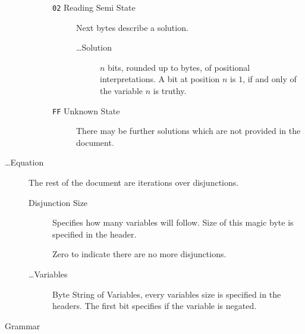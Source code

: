 \documentclass[12pt, letterpaper]{article}
\begin{document}
\begin{description}
\begin{description}
\begin{description}
\begin{description}
				\end{description}

				\item[\texttt{02} Reading Semi State]
				
				Next bytes describe a solution.

				\begin{description}
					
					\item[\ldots Solution]
					
					$n$ bits, rounded up to bytes, of
					positional interpretations. A bit
					at position $n$ is $1$, if and
					only of the variable $n$ is truthy.

				\end{description}

				\item[\texttt{FF} Unknown State]
				
				There may be further solutions
				which are not provided in the 
				document.

			\end{description}

		\end{description}
        

		\item[\ldots Equation]
		
		The rest of the document are iterations over
		disjunctions.

		\begin{description}
			\item[Disjunction Size]
			
			Specifies how many variables will
			follow. Size of this magic byte is
			specified in the header.

			Zero to indicate there are no more
			disjunctions.

			\item[\ldots Variables]
			
			Byte String of Variables, every
			variables size is specified in the
			headers. The first bit specifies if
			the variable is negated.

		\end{description}

        \item[Grammar]
        
		{\ }


\end{description}
\end{document}
